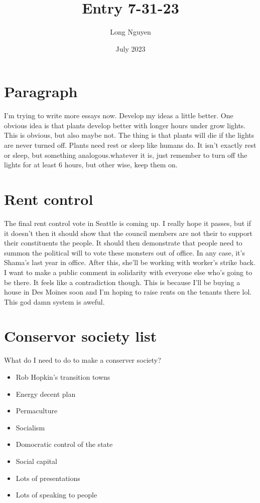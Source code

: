 \documentclass{article}
\title{Entry 7-31-23}
\author{Long Nguyen}
\date{July 2023}
\begin{document}
\maketitle

\section{Paragraph}
I'm trying to write more essays now. Develop my ideas a little better. One obvious idea is that plants develop better with longer hours under grow lights. This is obvious, but also maybe not. The thing is that plants will die if the lights are never turned off. Plants need rest or sleep like humans do. It isn't exactly rest or sleep, but something analogous.whatever it is, just remember to turn off the lights for at least 6 hours, but other wise, keep them on.

\section{Rent control}
The final rent control vote in Seattle is coming up. I really hope it passes, but if it doesn't then it should show that the council members are not their to support their constituents the people. It should then demonstrate that people need to summon the political will to vote these monsters out of office. In any case, it's Shama's last year in office. After this, she'll be working with worker's strike back. I want to make a public comment in solidarity with everyone else who's going to be there. It feels like a contradiction though. This is because I'll be buying a house in Des Moines soon and I'm hoping to raise rents on the tenants there lol. This god damn system is aweful.

\section{Conservor society list}
What do I need to do to make a conserver society?
\begin{itemize}
	\item Rob Hopkin's transition towns
	\item Energy decent plan
	\item Permaculture
	\item Socialism
	\item Domocratic control of the state
	\item Social capital
	\item Lots of presentations
	\item Lots of speaking to people
\end{itemize}
\end{document}
